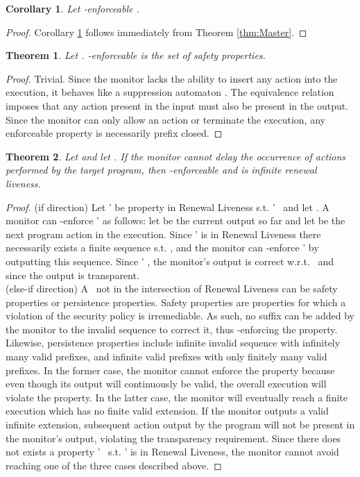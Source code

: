 \documentclass[12pt]{article}
\newtheorem{thm}{Theorem}
\newtheorem{cor}{Corollary}
\begin{document}
\begin{cor}
\label{cor:2} Let -enforceable .
\end{cor}
\begin{proof}
Corollary \ref{cor:2} follows immediately from Theorem \ref{thm:Master}.
\end{proof}




\begin{thm}
Let  .   -enforceable is the set of safety properties.
\end{thm}
\begin{proof}
Trivial. Since the monitor lacks the ability to insert any action into the execution, it behaves like a suppression automaton \cite{MoreEnforce}. The equivalence relation imposes that any action present in the input must also be present in the output. Since the monitor can only allow an action or terminate the execution, any enforceable property is necessarily prefix closed.
\end{proof}



\begin{thm}
Let  and let . If the monitor cannot delay the occurrence of actions performed by the target program, then  -enforceable   and  is infinite renewal  liveness.
\end{thm}
\begin{proof}
(if direction)
Let \Property' be property in Renewal  Liveness s.t. \Property'  \Property\ and let . A monitor can -enforce \Property' as follows: let  be the current output so far and let   be the next program action in the execution. Since \Property' is in Renewal  Liveness there necessarily exists a finite sequence  s.t. , and the monitor can -enforce \Property' by outputting this sequence. Since \Property'  \Property, the  monitor's output is correct w.r.t. \Property\ and since  the output is transparent. \\
(else-if direction)
A \Property\  not in the intersection of Renewal  Liveness can be safety properties or persistence properties.  Safety properties are properties for which a violation of the security policy is irremediable. As such, no suffix can be added by the monitor to the invalid sequence to correct it, thus -enforcing the property. Likewise, persistence properties include infinite invalid sequence with infinitely many valid prefixes, and infinite valid prefixes with only finitely many valid prefixes. In the former case, the monitor cannot enforce the property because even though its output will continuously be valid, the overall execution will violate the property. In the latter case, the monitor will eventually reach a finite execution  which has no finite valid extension.  If the monitor outputs a valid infinite extension, subsequent action output by the program will not be present in the monitor's output, violating the transparency requirement.  Since there does not exists a property \Property'  \Property\ s.t. \Property' is in Renewal  Liveness, the monitor cannot avoid reaching one of the three cases described above.
\end{proof}
\end{document}
